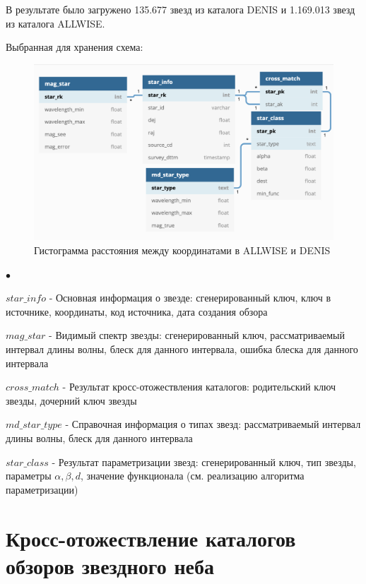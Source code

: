 \documentclass[12pt, a4paper]{article}
\newenvironment{compactlist}{
    \begin{list}{{$\bullet$}}{
      \setlength\partopsep{0pt}
      \setlength\parskip{0pt}
      \setlength\parsep{0pt}
      \setlength\topsep{0pt}
      \setlength\itemsep{0pt}
} }{
\end{list} }
\begin{document}
	В результате было загружено 135.677 звезд из каталога DENIS и 1.169.013 звезд из каталога ALLWISE.
	
	Выбранная для хранения схема:
	\newline
	\begin{figure}[h]
	\centering
	\includegraphics[width=15cm]{dds.png}
	\caption{Гистограмма расстояния между координатами в ALLWISE и DENIS}
	\end{figure}
	\begin{compactlist}
		\item $star\_info$ - Основная информация о звезде: сгенерированный ключ, ключ в источнике, координаты, код источника, дата создания обзора
		\item $mag\_star$ - Видимый спектр звезды: сгенерированный ключ, рассматриваемый интервал длины волны, блеск для данного интервала, ошибка блеска для данного интервала
		\item $cross\_match$ - Результат кросс-отожествления каталогов: родительский ключ звезды, дочерний ключ звезды
		\item $md\_star\_type$ - Справочная информация о типах звезд: рассматриваемый интервал длины волны, блеск для данного интервала
		\item $star\_class$ - Результат параметризации звезд: сгенерированный ключ, тип звезды, параметры $\alpha, \beta, d$, значение функционала (см. реализацию алгоритма параметризации)
	\end{compactlist}

	\section{Кросс-отожествление каталогов обзоров звездного неба}
\end{document}
